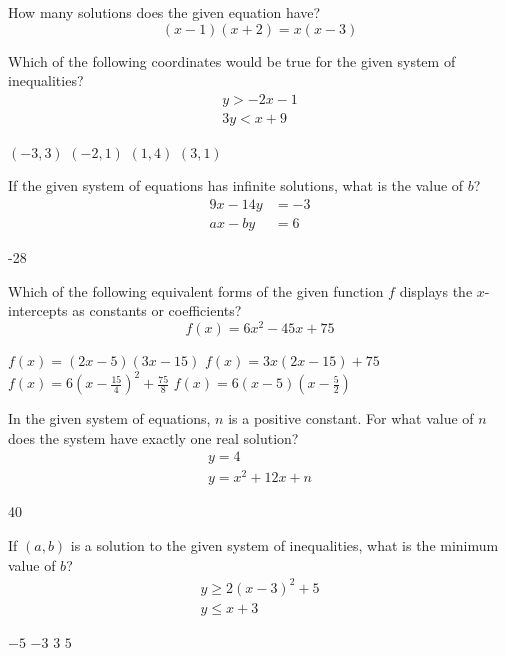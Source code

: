 \question[1]
How many solutions does the given equation have?
\[
  (x-1)(x+2)=x(x-3)
\]
\begin{choices}
\end{choices}

\question[1]
Which of the following coordinates would be true for the given system of inequalities?
\[
  \begin{gathered}
  y>-2x-1 \\
  3y<x+9
  \end{gathered}
\]
\begin{choices}
  \choice $(-3,3)$
  \choice $(-2,1)$
  \choice $(1,4)$
  \CorrectChoice $(3,1)$
\end{choices}



\newpage






\question[1]
If the given system of equations has infinite solutions, what is the value of $b$?
\[
  \begin{aligned}
  9x-14y &= -3 \\
  ax-by &= 6
  \end{aligned}
\]
\begin{solution}
-28
\end{solution}

\question[1]
Which of the following equivalent forms of the given function $f$ displays the $x$-intercepts as constants or coefficients?
\[
  f(x)=6x^2-45x+75
\]
\begin{choices}
  \choice $f(x)=(2x-5)(3x-15)$
  \choice $f(x)=3x(2x-15)+75$
  \choice $f(x)=6\left(x-\frac{15}{4}\right)^2+\frac{75}{8}$
  \CorrectChoice $f(x)=6(x-5)\left(x-\frac{5}{2}\right)$
\end{choices}

\question[1]
In the given system of equations, $n$ is a positive constant. For what value of $n$ does the system have exactly one real solution?
\[
  \begin{gathered}
  y=4 \\
  y=x^2+12x+n
  \end{gathered}
\]
\begin{solution}
40
\end{solution}




\newpage





\question[1]
If $(a, b)$ is a solution to the given system of inequalities, what is the minimum value of $b$?
\[
  \begin{gathered}
  y \geq 2(x-3)^2+5 \\
  y \leq x+3
  \end{gathered}
\]
\begin{choices}
  \choice $-5$
  \choice $-3$
  \choice $3$
  \CorrectChoice $5$
\end{choices}

